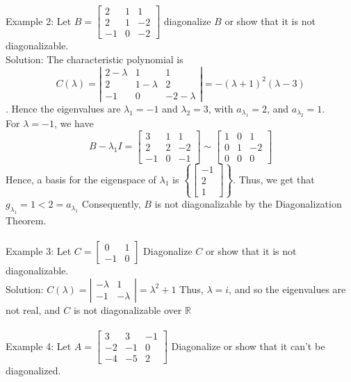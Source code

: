 \documentclass[10pt,letter]{article}
\begin{document}
\\ \\ 
Example 2: Let $B=\begin{bmatrix}2&1&1\\2&1&-2\\-1&0&-2\end{bmatrix}$ diagonalize $B$ or show that it is not diagonalizable. \\ 
Solution: The characteristic polynomial is $$C(\lambda)=\left|\begin{matrix}2-\lambda&1&1\\2&1-\lambda&2\\-1&0&-2-\lambda\end{matrix}\right|=-(\lambda+1)^2(\lambda-3)$$. Hence the eigenvalues are $\lambda_1=-1$ and $\lambda_2=3$, with $a_{\lambda_1}=2$, and $a_{\lambda_2}=1$.\\ 
For $\lambda=-1$, we have $$B-\lambda_1I=\begin{bmatrix}3&1&1\\2&2&-2\\-1&0&-1\end{bmatrix}\sim\begin{bmatrix}1&0&1\\0&1&-2\\0&0&0\end{bmatrix}$$ Hence, a basis for the eigenspace of $\lambda_1$ is $\left\{\begin{bmatrix}-1\\2\\1\end{bmatrix}\right\}$. Thus, we get that $g_{\lambda_1}=1<2=a_{\lambda_1}$ Consequently, $B$ is not diagonalizable by the Diagonalization Theorem. \\ \\ 
Example 3: Let $C=\begin{bmatrix}0&1\\-1&0\end{bmatrix}$ Diagonalize $C$ or show that it is not diagonalizable. \\ 
Solution: $C(\lambda)=\left|\begin{matrix}-\lambda&1\\-1&-\lambda\end{matrix}\right|=\lambda^2+1$ Thus, $\lambda=i$, and so the eigenvalues are not real, and $C$ is not diagonalizable over $\mathbb{R}$ \\ \\ 
Example 4: Let $A=\begin{bmatrix}3&3&-1\\-2&-1&0\\-4&-5&2\end{bmatrix}$ Diagonalize or show that it can't be diagonalized. \\ 
\end{document}
